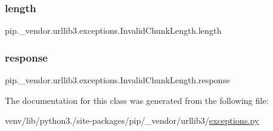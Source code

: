 \subsubsection{\texorpdfstring{length}{length}}
{\footnotesize\ttfamily pip.\+\_\+vendor.\+urllib3.\+exceptions.\+Invalid\+Chunk\+Length.\+length}

\mbox{\label{classpip_1_1__vendor_1_1urllib3_1_1exceptions_1_1InvalidChunkLength_ad3fc83fe1ed8fd22d780848422a298a9}} 
\subsubsection{\texorpdfstring{response}{response}}
{\footnotesize\ttfamily pip.\+\_\+vendor.\+urllib3.\+exceptions.\+Invalid\+Chunk\+Length.\+response}



The documentation for this class was generated from the following file\+:\begin{DoxyCompactItemize}
\item 
venv/lib/python3./site-\/packages/pip/\+\_\+vendor/urllib3/\hyperlink{pip_2__vendor_2urllib3_2exceptions_8py}{exceptions.\+py}\end{DoxyCompactItemize}
